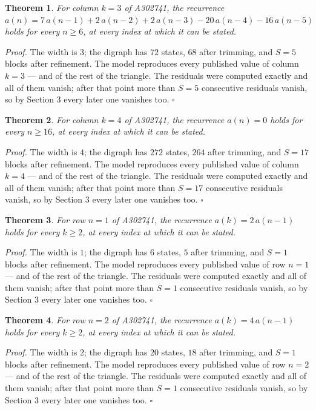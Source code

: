 \documentclass[11pt]{article}
\newtheorem{theorem}{Theorem}
\theoremstyle{definition}
\begin{document}
\begin{theorem} For column $k = 3$ of A302741, the recurrence $a(n) = 7\,a(n-1) + 2\,a(n-2) + 2\,a(n-3) - 20\,a(n-4) - 16\,a(n-5)$ holds for every $n \ge 6$, at every index at which it can be stated.\end{theorem}

{\itshape Proof.} The width is $3$; the digraph has $72$ states, $68$ after trimming, and $S = 5$ blocks after refinement. The model reproduces every published value of column $k = 3$ --- and of the rest of the triangle. The residuals were computed exactly and all of them vanish; after that point more than $S = 5$ consecutive residuals vanish, so by Section 3 every later one vanishes too. $\square$

\begin{theorem} For column $k = 4$ of A302741, the recurrence $a(n) = 0$ holds for every $n \ge 16$, at every index at which it can be stated.\end{theorem}

{\itshape Proof.} The width is $4$; the digraph has $272$ states, $264$ after trimming, and $S = 17$ blocks after refinement. The model reproduces every published value of column $k = 4$ --- and of the rest of the triangle. The residuals were computed exactly and all of them vanish; after that point more than $S = 17$ consecutive residuals vanish, so by Section 3 every later one vanishes too. $\square$

\begin{theorem} For row $n = 1$ of A302741, the recurrence $a(k) = 2\,a(n-1)$ holds for every $k \ge 2$, at every index at which it can be stated.\end{theorem}

{\itshape Proof.} The width is $1$; the digraph has $6$ states, $5$ after trimming, and $S = 1$ blocks after refinement. The model reproduces every published value of row $n = 1$ --- and of the rest of the triangle. The residuals were computed exactly and all of them vanish; after that point more than $S = 1$ consecutive residuals vanish, so by Section 3 every later one vanishes too. $\square$

\begin{theorem} For row $n = 2$ of A302741, the recurrence $a(k) = 4\,a(n-1)$ holds for every $k \ge 2$, at every index at which it can be stated.\end{theorem}

{\itshape Proof.} The width is $2$; the digraph has $20$ states, $18$ after trimming, and $S = 1$ blocks after refinement. The model reproduces every published value of row $n = 2$ --- and of the rest of the triangle. The residuals were computed exactly and all of them vanish; after that point more than $S = 1$ consecutive residuals vanish, so by Section 3 every later one vanishes too. $\square$
\end{document}
